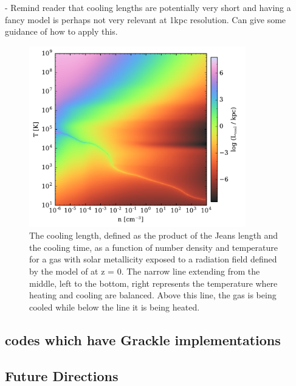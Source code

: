 - Remind reader that cooling lengths are potentially very short and
having a fancy model is perhaps not very relevant at 1kpc
resolution. Can give some guidance of how to apply this.

\begin{figure}
  \centering
  \includegraphics[width=0.84\textwidth]{cooling_length.pdf}
  \caption{
    The cooling length, defined as the product of the Jeans length and
    the cooling time, as a function of number density and temperature
    for a gas with solar metallicity exposed to a radiation field
    defined by the model of \citet{2012ApJ...746..125H} at z = 0.  The
    narrow line extending from the middle, left to the bottom, right
    represents the temperature where heating and cooling are
    balanced.  Above this line, the gas is being cooled while below
    the line it is being heated.
  } \label{fig:cooling-length}
\end{figure}

\subsection{codes which have Grackle implementations}


\subsection{Future Directions} \label{Future_Directions}

